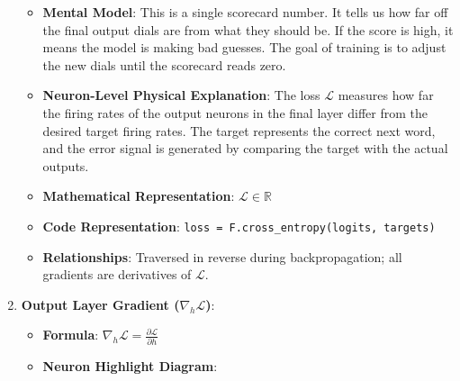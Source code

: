 \begin{enumerate}
\begin{itemize}
      \item \textbf{Mental Model}: This is a single scorecard number. It tells us how far off the final output dials are from what they should be. If the score is high, it means the model is making bad guesses. The goal of training is to adjust the new dials until the scorecard reads zero.
      \item \textbf{Neuron-Level Physical Explanation}: The loss $\mathcal{L}$ measures how far the firing rates of the output neurons in the final layer differ from the desired target firing rates. The target represents the correct next word, and the error signal is generated by comparing the target with the actual outputs.
      \item \textbf{Mathematical Representation}: $\mathcal{L} \in \mathbb{R}$
      \item \textbf{Code Representation}: \texttt{loss = F.cross\_entropy(logits, targets)}
      \item \textbf{Relationships}: Traversed in reverse during backpropagation; all gradients are derivatives of $\mathcal{L}$.
    \end{itemize}

  \item \textbf{Output Layer Gradient ($\nabla_h \mathcal{L}$)}:
    \begin{itemize}
      \item \textbf{Formula}: $\nabla_h \mathcal{L} = \frac{\partial \mathcal{L}}{\partial h}$
      \item \textbf{Neuron Highlight Diagram}:

\begin{center}
\begin{adjustbox}{max width=0.85\linewidth}
\end{adjustbox}
\end{center}
\end{itemize}
\end{enumerate}
